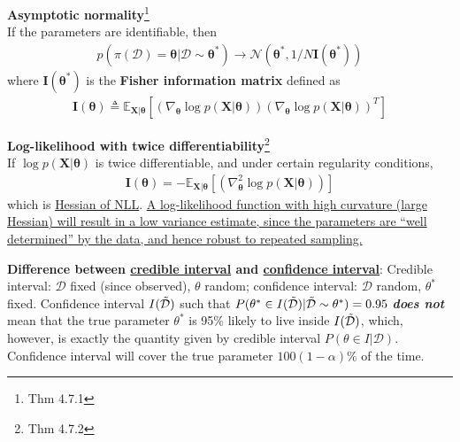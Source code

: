 \begin{theorem}\label{thm:asymnorm}
    \textbf{Asymptotic normality}\footnote{
    \citep{pml1Book} Thm 4.7.1
    }\\
    If the parameters are identifiable, then
    \begin{gather}
        p(\pi(\mathcal{D})=\bm{\theta}|\mathcal{D}\sim\bm{\theta}^*)
        \to
        \mathcal{N}(\bm{\theta}^*,1/N\mathbf{I}(\bm{\theta}^*))
    \end{gather}
    where $\mathbf{I}(\bm{\theta}^*)$ is the \textbf{Fisher information matrix} defined as
    \begin{gather}
        \mathbf{I}(\bm{\theta})
        \triangleq\mathbb{E}_{\bm{X}|\bm{\theta}}\left[ 
            (\nabla_{\bm{\theta}}\log{p(\bm{X}|\bm{\theta})})
            (\nabla_{\bm{\theta}}\log{p(\bm{X}|\bm{\theta})})^T
        \right]
    \end{gather}
\end{theorem}

\begin{theorem}
    \textbf{Log-likelihood with twice differentiability}\footnote{
    \citep{pml1Book} Thm 4.7.2
    }\\
    If $\log p(\bm{X}|\bm{\theta})$ is twice differentiable, and under certain regularity conditions,
    \begin{gather}
        \mathbf{I}(\bm{\theta})
        =-\mathbb{E}_{\bm{X}|\bm{\theta}}\left[ 
            (\nabla_{\bm{\theta}}^2\log{p(\bm{X}|\bm{\theta})})
        \right]
    \end{gather}
    which is \uline{Hessian of NLL}.
    \uline{A log-likelihood function with high curvature (large Hessian) will result in
    a low variance estimate, since the parameters are ``well determined'' by the data,
    and hence robust to repeated sampling.}
\end{theorem}



\textbf{Difference between \uline{credible interval} and \uline{confidence interval}}:
Credible interval: $\mathcal{D}$ fixed (since observed), $\theta$ random;
confidence interval: $\mathcal{D}$ random, $\theta^*$ fixed.
Confidence interval $I(\Tilde{\mathcal{D}})$ such that $P(\theta^*\in I(\Tilde{\mathcal{D}})|\Tilde{\mathcal{D}}\sim\theta^*)=0.95$ \textbf{\textit{does not}} mean that
the true parameter $\theta^*$ is 95\% likely to live inside $I(\Tilde{\mathcal{D}})$, 
which, however, is exactly the quantity given by credible interval {\color{red}$P(\theta\in I|\mathcal{D})$}.
Confidence interval will cover the true parameter $100(1-\alpha)\%$ of the time.

